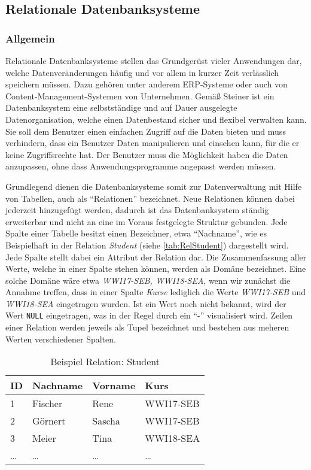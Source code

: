 \subsection{Relationale Datenbanksysteme}

\subsubsection{Allgemein}

Relationale Datenbanksysteme stellen das Grundgerüst vieler Anwendungen dar, welche Datenveränderungen häufig und vor allem in kurzer Zeit verlässlich speichern müssen.
Dazu gehören unter anderem \ac{ERP}-Systeme oder auch von Content-Management-Systemen von Unternehmen.
Gemäß Steiner ist ein Datenbanksystem eine selbstständige und auf Dauer ausgelegte Datenorganisation, welche einen Datenbestand sicher und flexibel verwalten kann.
Sie soll dem Benutzer einen einfachen Zugriff auf die Daten bieten und muss verhindern, dass ein Benutzer Daten manipulieren und einsehen kann, für die er keine Zugriffsrechte hat.
Der Benutzer muss die Möglichkeit haben die Daten anzupassen, ohne dass Anwendungsprogramme angepasst werden müssen.\autocite[Vgl.][S.5 f.]{Book_DB_2}

Grundlegend dienen die Datenbanksysteme somit zur Datenverwaltung mit Hilfe von Tabellen, auch als \enquote{Relationen} bezeichnet.
Neue Relationen können dabei jederzeit hinzugefügt werden, dadurch ist das Datenbanksystem ständig erweiterbar und nicht an eine im Voraus festgelegte Struktur gebunden.
Jede Spalte einer Tabelle besitzt einen Bezeichner, etwa \enquote{Nachname}, wie es Beispielhaft in der Relation \emph{Student} (siehe \vref{tab:RelStudent}) dargestellt wird.
Jede Spalte stellt dabei ein Attribut der Relation dar.
Die Zusammenfassung aller Werte, welche in einer Spalte stehen können, werden als Domäne bezeichnet.
Eine solche Domäne wäre etwa \emph{WWI17-SEB, WWI18-SEA}, wenn wir zunächst die Annahme treffen, dass in einer Spalte \emph{Kurse} lediglich die Werte \emph{WWI17-SEB} und \emph{WWI18-SEA} eingetragen wurden.
Ist ein Wert noch nicht bekannt, wird der Wert \texttt{NULL} eingetragen, was in der Regel durch ein \enquote{-} visualisiert wird.
Zeilen einer Relation werden jeweils als Tupel bezeichnet und bestehen aus meheren Werten verschiedener Spalten.\autocite[vgl. S.9 ff.][]{Book_DB_2}

\begin{table}
    \begin{tabular}[h]{l | l | l | l}
        ID & Nachname & Vorname & Kurs \\ \hline
        1 & Fischer & Rene & WWI17-SEB \\
        2 & Görnert & Sascha & WWI17-SEB \\
        3 & Meier & Tina & WWI18-SEA \\
        \dots & \dots & \dots & \dots \\
        \end{tabular}
        \caption{Beispiel Relation: Student}
        \label{tab:RelStudent}
\end{table}


